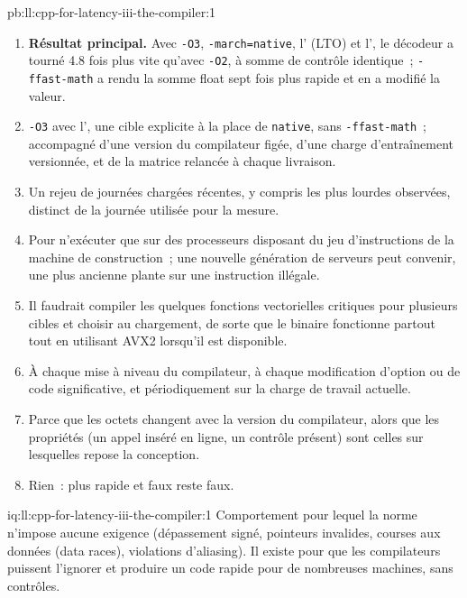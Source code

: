 \begin{solution}{pb:ll:cpp-for-latency-iii-the-compiler:1}
\begin{enumerate}
sanitiseur.
\item \textbf{Résultat principal.} Avec \texttt{-O3}, \texttt{-march=native}, l' (LTO) et l', le décodeur
a tourné 4.8 fois plus vite qu'avec \texttt{-O2}, à somme de contrôle identique~; \texttt{-ffast-math} a rendu la somme float sept fois
plus rapide et en a modifié la valeur.
\item \texttt{-O3} avec l', une cible explicite à la place de \texttt{native}, sans
\texttt{-ffast-math}~; accompagné d'une version du compilateur figée, d'une charge d'entraînement versionnée, et de la matrice
relancée à chaque livraison.
\item Un rejeu de journées chargées récentes, y compris les plus lourdes observées, distinct de la journée utilisée pour la mesure.
\item Pour n'exécuter que sur des processeurs disposant du jeu d'instructions de la machine de construction~; une nouvelle génération de serveurs peut convenir, une plus ancienne
plante sur une instruction illégale.
\item Il faudrait compiler les quelques fonctions vectorielles critiques pour plusieurs cibles et choisir au chargement, de sorte que le binaire fonctionne
partout tout en utilisant AVX2 lorsqu'il est disponible.
\item À chaque mise à niveau du compilateur, à chaque modification d'option ou de code significative, et périodiquement sur la charge de travail actuelle.
\item Parce que les octets changent avec la version du compilateur, alors que les propriétés (un appel inséré en ligne, un contrôle présent) sont celles sur lesquelles
repose la conception.
\item Rien~: plus rapide et faux reste faux.
\end{enumerate}
\end{solution}

\begin{solution}{iq:ll:cpp-for-latency-iii-the-compiler:1}
Comportement pour lequel la norme n'impose aucune exigence (dépassement signé, pointeurs invalides, courses aux données (data races), violations
d'aliasing). Il existe pour que les compilateurs puissent l'ignorer et produire un code rapide pour de nombreuses machines, sans contrôles.
\end{solution}


